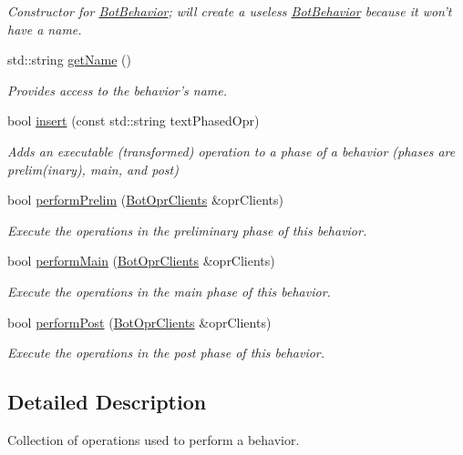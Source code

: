 \begin{DoxyCompactItemize}
\begin{DoxyCompactList}\small\item\em Constructor for \hyperlink{classBotBehavior}{Bot\-Behavior}; will create a useless \hyperlink{classBotBehavior}{Bot\-Behavior} because it won't have a name. \end{DoxyCompactList}\item 
std\-::string \hyperlink{classBotBehavior_a7a79661c4afeab6fee0388fe84c6c45a}{get\-Name} ()
\begin{DoxyCompactList}\small\item\em Provides access to the behavior's name. \end{DoxyCompactList}\item 
bool \hyperlink{classBotBehavior_a2814c74acdbb8e527b24d67de90d393d}{insert} (const std\-::string text\-Phased\-Opr)
\begin{DoxyCompactList}\small\item\em Adds an executable (transformed) operation to a phase of a behavior (phases are prelim(inary), main, and post) \end{DoxyCompactList}\item 
bool \hyperlink{classBotBehavior_aebab943aa7ebb3a8ea540d8eccf929e3}{perform\-Prelim} (\hyperlink{classBotOprClients}{Bot\-Opr\-Clients} \&opr\-Clients)
\begin{DoxyCompactList}\small\item\em Execute the operations in the preliminary phase of this behavior. \end{DoxyCompactList}\item 
bool \hyperlink{classBotBehavior_add170f17aa5aa70014bb5dd23d1f0f50}{perform\-Main} (\hyperlink{classBotOprClients}{Bot\-Opr\-Clients} \&opr\-Clients)
\begin{DoxyCompactList}\small\item\em Execute the operations in the main phase of this behavior. \end{DoxyCompactList}\item 
bool \hyperlink{classBotBehavior_a6326a763ff29158e41201b2957004b9b}{perform\-Post} (\hyperlink{classBotOprClients}{Bot\-Opr\-Clients} \&opr\-Clients)
\begin{DoxyCompactList}\small\item\em Execute the operations in the post phase of this behavior. \end{DoxyCompactList}\end{DoxyCompactItemize}


\subsection{Detailed Description}
Collection of operations used to perform a behavior. 

